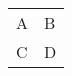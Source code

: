 \documentclass{article}
\begin{document}
\begin{xltabular}{\linewidth}{XX}
A & B \\
C & D \\
\end{xltabular} 
\end{document}

